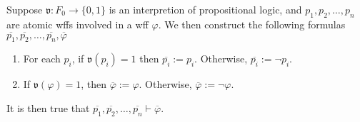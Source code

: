 \documentclass{treatise}
\begin{document}
\begin{lemma}  \label{logic-interpretation-cascade}
Suppose $\mathfrak{v}: F_0 \to \{ 0, 1 \}$ is an interpretion of propositional logic, and $p_1, p_2, \hdots, p_n$ are atomic wffs involved in a wff $\varphi$. We then construct the following formulas $\overline{p_1}, \overline{p_2}, \hdots, \overline{p_n}, \overline{\varphi}$
\begin{enumerate}
    \item For each $p_i$, if $\mathfrak{v}(p_i) = 1$ then $\overline{p_i} := p_i$. Otherwise, $\overline{p_i} := \neg p_i$.
    \item If $\mathfrak{v}(\varphi) = 1$, then $\overline{\varphi} := \varphi$. Otherwise, $\overline{\varphi} := \neg \varphi$.
\end{enumerate}
It is then true that $\overline{p_1}, \overline{p_2}, \hdots, \overline{p_n} \vdash \overline{\varphi}$.
\end{lemma}
\end{document}
